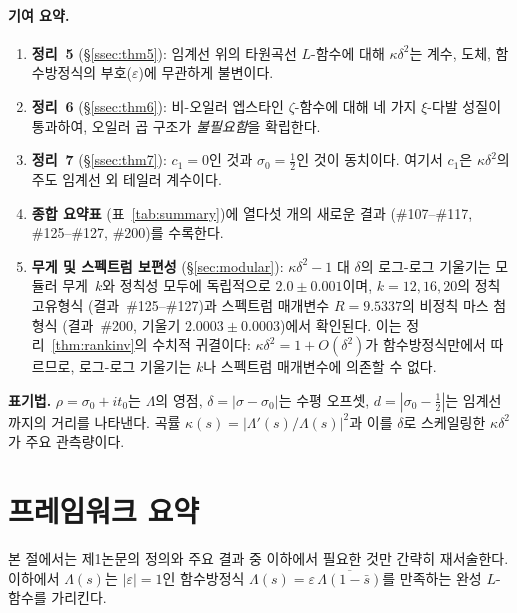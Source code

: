 \documentclass[11pt, a4paper]{article}
\theoremstyle{plain}
\theoremstyle{definition}
\begin{document}
\paragraph{기여 요약.}
\begin{enumerate}
  \item \textbf{정리~5} (\S\ref{ssec:thm5}): 임계선 위의 타원곡선
        $L$-함수에 대해 $\kappa\delta^{2}$는
        계수, 도체, 함수방정식의 부호($\varepsilon$)에 무관하게
        불변이다.
  \item \textbf{정리~6} (\S\ref{ssec:thm6}): 비-오일러 엡스타인
        $\zeta$-함수에 대해 네 가지 $\xi$-다발 성질이 통과하여,
        오일러 곱 구조가 \emph{불필요함}을 확립한다.
  \item \textbf{정리~7} (\S\ref{ssec:thm7}): $c_{1}=0$인 것과
        $\sigma_{0}=\tfrac{1}{2}$인 것이 동치이다.
        여기서 $c_{1}$은 $\kappa\delta^{2}$의 주도 임계선 외
        테일러 계수이다.
  \item \textbf{종합 요약표} (표~\ref{tab:summary})에
        열다섯 개의 새로운 결과 (\#107--\#117, \#125--\#127, \#200)를 수록한다.
  \item \textbf{무게 및 스펙트럼 보편성} (\S\ref{sec:modular}):
        $\kappa\delta^{2}-1$ 대 $\delta$의 로그-로그 기울기는
        모듈러 무게~$k$와 정칙성 모두에 독립적으로 $2.0\pm0.001$이며,
        $k=12,16,20$의 정칙 고유형식 (결과~\#125--\#127)과
        스펙트럼 매개변수 $R=9.5337$의 비정칙 마스 첨형식
        (결과~\#200, 기울기 $2.0003\pm 0.0003$)에서 확인된다.
        이는 정리~\ref{thm:rankinv}의 수치적 귀결이다:
        $\kappa\delta^{2}=1+O(\delta^{2})$가
        함수방정식만에서 따르므로, 로그-로그 기울기는
        $k$나 스펙트럼 매개변수에 의존할 수 없다.
\end{enumerate}

\noindent\textbf{표기법.} $\rho = \sigma_{0}+it_{0}$는 $\Lambda$의 영점,
$\delta=|\sigma-\sigma_{0}|$는 수평 오프셋,
$d=|\sigma_{0}-\tfrac{1}{2}|$는 임계선까지의 거리를 나타낸다.
곡률 $\kappa(s) = |\Lambda'(s)/\Lambda(s)|^{2}$과
이를 $\delta$로 스케일링한 $\kappa\delta^{2}$가
주요 관측량이다.


\section{프레임워크 요약}
\label{sec:recap}

본 절에서는 제1논문의 정의와 주요 결과 중 이하에서 필요한 것만 간략히
재서술한다. 이하에서 $\Lambda(s)$는 $|\varepsilon|=1$인
함수방정식 $\Lambda(s) = \varepsilon\,\overline{\Lambda(1-\bar{s})}$를
만족하는 완성 $L$-함수를 가리킨다.
\end{document}
